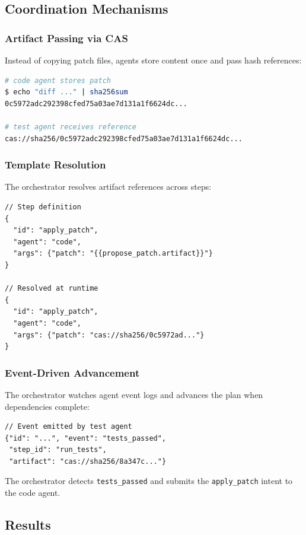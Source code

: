 \documentclass[11pt]{article}
\begin{document}
\subsection{Coordination Mechanisms}

\subsubsection{Artifact Passing via CAS}

Instead of copying patch files, agents store content once and pass hash references:

\begin{lstlisting}[language=bash]
# code agent stores patch
$ echo "diff ..." | sha256sum
0c5972adc292398cfed75a03ae7d131a1f6624dc...

# test agent receives reference
cas://sha256/0c5972adc292398cfed75a03ae7d131a1f6624dc...
\end{lstlisting}

\subsubsection{Template Resolution}

The orchestrator resolves artifact references across steps:

\begin{lstlisting}
// Step definition
{
  "id": "apply_patch",
  "agent": "code",
  "args": {"patch": "{{propose_patch.artifact}}"}
}

// Resolved at runtime
{
  "id": "apply_patch",
  "agent": "code",
  "args": {"patch": "cas://sha256/0c5972ad..."}
}
\end{lstlisting}

\subsubsection{Event-Driven Advancement}

The orchestrator watches agent event logs and advances the plan when dependencies complete:

\begin{lstlisting}
// Event emitted by test agent
{"id": "...", "event": "tests_passed", 
 "step_id": "run_tests", 
 "artifact": "cas://sha256/8a347c..."}
\end{lstlisting}

The orchestrator detects \texttt{tests\_passed} and submits the \texttt{apply\_patch} intent to the code agent.

\subsection{Results}
\end{document}
